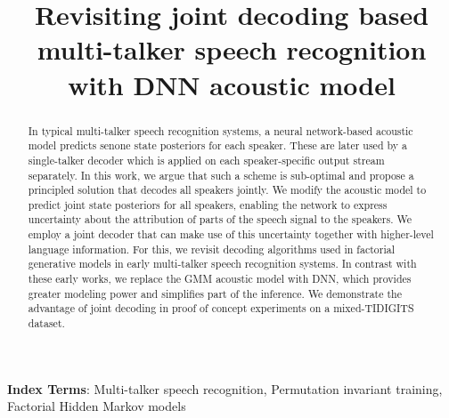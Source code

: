 \documentclass[a4paper]{article}
\title{Revisiting joint decoding based multi-talker speech recognition with DNN acoustic model}
\begin{document}
\maketitle
% 
\begin{abstract}
In typical multi-talker speech recognition systems, a neural network-based acoustic model predicts senone state posteriors for each speaker. These are later used by a single-talker decoder which is applied on each speaker-specific output stream separately. In this work, we argue that such a scheme is sub-optimal and propose a principled solution that decodes all speakers jointly. We modify the acoustic model to predict joint state posteriors for all speakers, enabling the network to express uncertainty about the attribution of parts of the speech signal to the speakers. We employ a joint decoder that can make use of this uncertainty together with higher-level language information. For this, we revisit decoding algorithms used in factorial generative models in early multi-talker speech recognition systems. In contrast with these early works, we replace the GMM acoustic model with DNN, which provides greater modeling power and simplifies part of the inference.  We demonstrate the advantage of joint decoding in proof of concept experiments on a mixed-TIDIGITS dataset.
\end{abstract}
\noindent\textbf{Index Terms}: Multi-talker speech recognition, Permutation invariant training, Factorial Hidden Markov models

%
%
\end{document}
